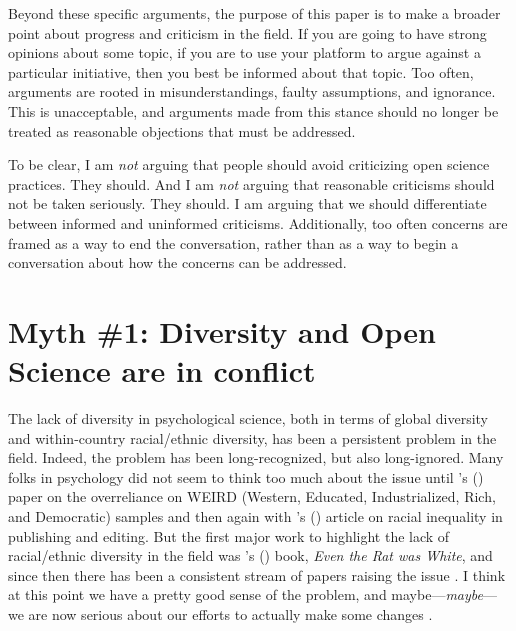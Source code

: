 \documentclass[authordate, empirical]{jote-new-article}
\begin{document}
Beyond these specific arguments, the purpose of this paper is to make a broader point about progress and criticism in the field. If you are going to have strong opinions about some topic, if you are to use your platform to argue against a particular initiative, then you best be informed about that topic. Too often, arguments are rooted in misunderstandings, faulty assumptions, and ignorance. This is unacceptable, and arguments made from this stance should no longer be treated as reasonable objections that must be addressed.







To be clear, I am \emph{not} arguing that people should avoid criticizing open science practices. They should. And I am \emph{not} arguing that reasonable criticisms should not be taken seriously. They should. I am arguing that we should differentiate between informed and uninformed criticisms. Additionally, too often concerns are framed as a way to end the conversation, rather than as a way to begin a conversation about how the concerns can be addressed.







\section{Myth \#1: Diversity and Open Science are in conflict}







The lack of diversity in psychological science, both in terms of global diversity and within-country racial/ethnic diversity, has been a persistent problem in the field. Indeed, the problem has been long-recognized, but also long-ignored. Many folks in psychology did not seem to think too much about the issue until \citeauthor{Henrich2010}'s (\hspace*{-2pt}\citeyear{Henrich2010}) paper on the overreliance on WEIRD (Western, Educated, Industrialized, Rich, and Democratic) samples and then again with \citeyear{Roberts2020}'s (\hspace*{-2pt}\citeyear{Roberts2020}) article on racial inequality in publishing and editing. But the first major work to highlight the lack of racial/ethnic diversity in the field was \citeauthor{Guthrie1976}'s (\hspace*{-2pt}\citeyear{Guthrie1976}) book, \emph{Even the Rat was White}, and since then there has been a consistent stream of papers raising the issue \parencites[e.g.,][]{Arnett2008}{Draper2022}{Graham1992}{Green2022}{Hall2001}{Hartmann2013}{Lin2022}{Moriguchi2022}{Nielsen2017}{Ponterotto1988}{Thalmayer2021}. I think at this point we have a pretty good sense of the problem, and maybe—\emph{maybe}—we are now serious about our efforts to actually make some changes \parencites[see][for a discussion of the complexities of the issue]{Syed2023}.
\end{document}
